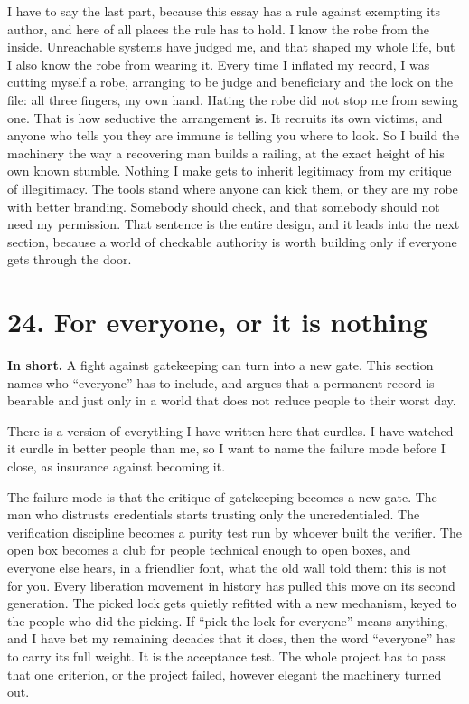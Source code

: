 \documentclass[11pt]{article}
\begin{document}
I have to say the last part, because this essay has a rule against exempting its author, and here of all places the rule has to hold. I know the robe from the inside. Unreachable systems have judged me, and that shaped my whole life, but I also know the robe from wearing it. Every time I inflated my record, I was cutting myself a robe, arranging to be judge and beneficiary and the lock on the file: all three fingers, my own hand. Hating the robe did not stop me from sewing one. That is how seductive the arrangement is. It recruits its own victims, and anyone who tells you they are immune is telling you where to look. So I build the machinery the way a recovering man builds a railing, at the exact height of his own known stumble. Nothing I make gets to inherit legitimacy from my critique of illegitimacy. The tools stand where anyone can kick them, or they are my robe with better branding. Somebody should check, and that somebody should not need my permission. That sentence is the entire design, and it leads into the next section, because a world of checkable authority is worth building only if everyone gets through the door.

\section*{24. For everyone, or it is nothing}

\textbf{In short.} A fight against gatekeeping can turn into a new gate. This section names who ``everyone'' has to include, and argues that a permanent record is bearable and just only in a world that does not reduce people to their worst day.

There is a version of everything I have written here that curdles. I have watched it curdle in better people than me, so I want to name the failure mode before I close, as insurance against becoming it.

The failure mode is that the critique of gatekeeping becomes a new gate. The man who distrusts credentials starts trusting only the uncredentialed. The verification discipline becomes a purity test run by whoever built the verifier. The open box becomes a club for people technical enough to open boxes, and everyone else hears, in a friendlier font, what the old wall told them: this is not for you. Every liberation movement in history has pulled this move on its second generation. The picked lock gets quietly refitted with a new mechanism, keyed to the people who did the picking. If ``pick the lock for everyone'' means anything, and I have bet my remaining decades that it does, then the word ``everyone'' has to carry its full weight. It is the acceptance test. The whole project has to pass that one criterion, or the project failed, however elegant the machinery turned out.
\end{document}
